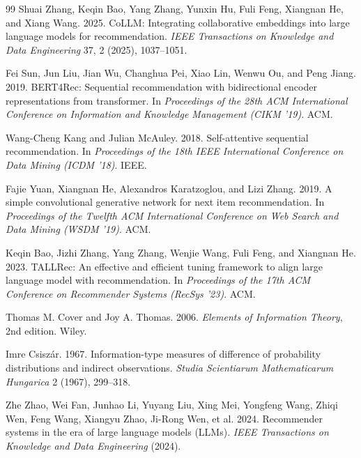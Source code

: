 ﻿\documentclass{article}
\begin{document}
\begin{thebibliography}{99}
Shuai Zhang, Keqin Bao, Yang Zhang, Yunxin Hu, Fuli Feng, Xiangnan He, and Xiang Wang. 2025.
CoLLM: Integrating collaborative embeddings into large language models for recommendation.
\textit{IEEE Transactions on Knowledge and Data Engineering} 37, 2 (2025), 1037--1051.

Fei Sun, Jun Liu, Jian Wu, Changhua Pei, Xiao Lin, Wenwu Ou, and Peng Jiang. 2019.
BERT4Rec: Sequential recommendation with bidirectional encoder representations from transformer.
In \textit{Proceedings of the 28th ACM International Conference on Information and Knowledge Management (CIKM '19)}. ACM.

Wang-Cheng Kang and Julian McAuley. 2018.
Self-attentive sequential recommendation.
In \textit{Proceedings of the 18th IEEE International Conference on Data Mining (ICDM '18)}. IEEE.

Fajie Yuan, Xiangnan He, Alexandros Karatzoglou, and Lizi Zhang. 2019.
A simple convolutional generative network for next item recommendation.
In \textit{Proceedings of the Twelfth ACM International Conference on Web Search and Data Mining (WSDM '19)}. ACM.

Keqin Bao, Jizhi Zhang, Yang Zhang, Wenjie Wang, Fuli Feng, and Xiangnan He. 2023.
TALLRec: An effective and efficient tuning framework to align large language model with recommendation.
In \textit{Proceedings of the 17th ACM Conference on Recommender Systems (RecSys '23)}. ACM.

Thomas M. Cover and Joy A. Thomas. 2006.
\textit{Elements of Information Theory}, 2nd edition.
Wiley.

Imre Csisz\'ar. 1967.
Information-type measures of difference of probability distributions and indirect observations.
\textit{Studia Scientiarum Mathematicarum Hungarica} 2 (1967), 299--318.

Zhe Zhao, Wei Fan, Junhao Li, Yuyang Liu, Xing Mei, Yongfeng Wang, Zhiqi Wen, Feng Wang, Xiangyu Zhao, Ji-Rong Wen, et al. 2024.
Recommender systems in the era of large language models (LLMs).
\textit{IEEE Transactions on Knowledge and Data Engineering} (2024).

\end{thebibliography}

\clearpage
\appendix
\raggedbottom
{}
\end{document}
